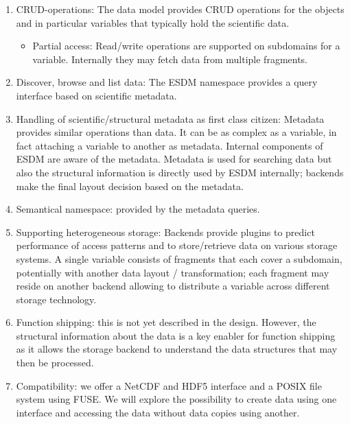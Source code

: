 \begin{enumerate}
\item CRUD-operations: The data model provides CRUD operations for the objects and in particular variables that typically hold the scientific data.
\begin{itemize}
\item Partial access: Read/write operations are supported on subdomains for a variable. Internally they may fetch data
from multiple fragments.
\end{itemize}
\item Discover, browse and list data: The ESDM namespace provides a query interface based on scientific metadata.

\item Handling of scientific/structural metadata as first class citizen: Metadata provides similar operations than data.
It can be as complex as a variable, in fact attaching a variable to another as metadata.
Internal components of ESDM are aware of the metadata.
Metadata is used for searching data but also the structural information is directly used by ESDM internally; backends make the final layout decision based on the metadata.

\item Semantical namespace: provided by the metadata queries.
\item Supporting heterogeneous storage: Backends provide plugins to predict performance of access patterns and to store/retrieve data on various storage systems.
A single variable consists of fragments that each cover a subdomain, potentially with another data layout / transformation; each fragment may reside on another backend allowing to distribute a variable across different storage technology.

\item Function shipping: this is not yet described in the design. However, the structural information about the data is a key enabler for function shipping as it allows the storage backend to understand the data structures that may then be processed.

\item Compatibility: we offer a NetCDF and HDF5 interface and a POSIX file system using FUSE.
We will explore the possibility to create data using one interface and accessing the data without data copies using another.
\end{enumerate}



